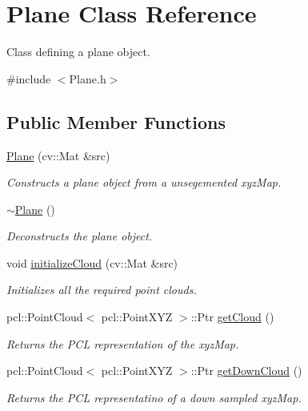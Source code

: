 \hypertarget{class_plane}{}\section{Plane Class Reference}
\label{class_plane}


Class defining a plane object.  




{\ttfamily \#include $<$Plane.\+h$>$}

\subsection*{Public Member Functions}
\begin{DoxyCompactItemize}
\item 
\hyperlink{class_plane_a94bc1ca29c305edb76676528b1a9465c}{Plane} (cv\+::\+Mat \&src)
\begin{DoxyCompactList}\small\item\em Constructs a plane object from a unsegemented xyz\+Map. \end{DoxyCompactList}\item 
\hypertarget{class_plane_a69abd86051c880dcb44b249ad10c4436}{}\label{class_plane_a69abd86051c880dcb44b249ad10c4436} 
\hyperlink{class_plane_a69abd86051c880dcb44b249ad10c4436}{$\sim$\+Plane} ()
\begin{DoxyCompactList}\small\item\em Deconstructs the plane object. \end{DoxyCompactList}\item 
void \hyperlink{class_plane_ab884c9687d63290912707f749adad115}{initialize\+Cloud} (cv\+::\+Mat \&src)
\begin{DoxyCompactList}\small\item\em Initializes all the required point clouds. \end{DoxyCompactList}\item 
pcl\+::\+Point\+Cloud$<$ pcl\+::\+Point\+X\+YZ $>$\+::Ptr \hyperlink{class_plane_a89c277f419ffb0e9d53f29127109465b}{get\+Cloud} ()
\begin{DoxyCompactList}\small\item\em Returns the P\+CL representation of the xyz\+Map. \end{DoxyCompactList}\item 
pcl\+::\+Point\+Cloud$<$ pcl\+::\+Point\+X\+YZ $>$\+::Ptr \hyperlink{class_plane_abad6f7c26005ad7ab847af5acaad9c31}{get\+Down\+Cloud} ()
\begin{DoxyCompactList}\small\item\em Returns the P\+CL representatino of a down sampled xyz\+Map. \end{DoxyCompactList}\item 

\end{DoxyCompactItemize}
